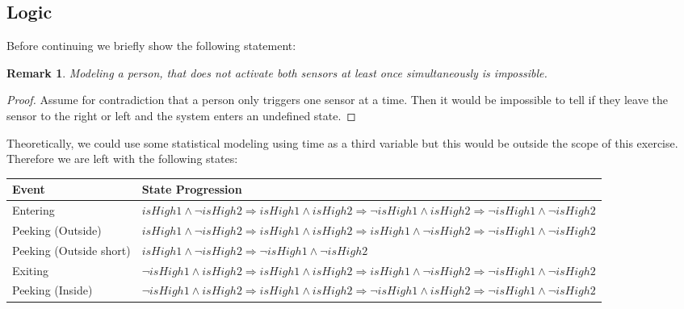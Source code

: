 \documentclass[]{article}
\newtheorem*{remark}{Remark}
\begin{document}
\begin{sloppypar}
\subsection{Logic}
Before continuing we briefly show the following statement:\\
\begin{remark}
	Modeling a person, that does not activate both sensors at least once simultaneously is impossible.
\end{remark}
\begin{proof}
	Assume for contradiction that a person only triggers one sensor at a time. Then it would be impossible to tell if they leave the sensor to the right or left and the system enters an undefined state.
\end{proof}
Theoretically, we could use some statistical modeling using time as a third variable but this would be outside the scope of this exercise.
Therefore we are left with the following states:
\begin{table}[H]
	\centering
\begin{tabularx}{.9\textwidth}{| l | X |}
			\hline
			Event & State Progression \\
			\hline
			Entering & $\mathit{isHigh1} \wedge \neg \mathit{isHigh2} \Longrightarrow \mathit{isHigh1} \wedge \mathit{isHigh2} \Longrightarrow \neg \mathit{isHigh1} \wedge \mathit{isHigh2} \Longrightarrow \neg \mathit{isHigh1} \wedge \neg \mathit{isHigh2}$\\
			\hline
			Peeking (Outside) & $\mathit{isHigh1} \wedge \neg \mathit{isHigh2} \Longrightarrow \mathit{isHigh1} \wedge \mathit{isHigh2} \Longrightarrow \mathit{isHigh1} \wedge \neg \mathit{isHigh2} \Longrightarrow \neg \mathit{isHigh1} \wedge \neg \mathit{isHigh2}$\\
			\hline
			Peeking (Outside short) & $\mathit{isHigh1} \wedge \neg \mathit{isHigh2} \Longrightarrow \neg \mathit{isHigh1} \wedge \neg \mathit{isHigh2}$\\
			\hline
			Exiting &  $\neg \mathit{isHigh1} \wedge \mathit{isHigh2} \Longrightarrow \mathit{isHigh1} \wedge \mathit{isHigh2} \Longrightarrow \mathit{isHigh1} \wedge \neg \mathit{isHigh2} \Longrightarrow \neg \mathit{isHigh1} \wedge \neg \mathit{isHigh2}$\\
			\hline
			Peeking (Inside) & $\neg \mathit{isHigh1} \wedge \mathit{isHigh2} \Longrightarrow \mathit{isHigh1} \wedge \mathit{isHigh2} \Longrightarrow \neg \mathit{isHigh1} \wedge \mathit{isHigh2} \Longrightarrow \neg \mathit{isHigh1} \wedge \neg \mathit{isHigh2}$\\

\end{tabularx}
\end{table}
\end{sloppypar}
\end{document}
